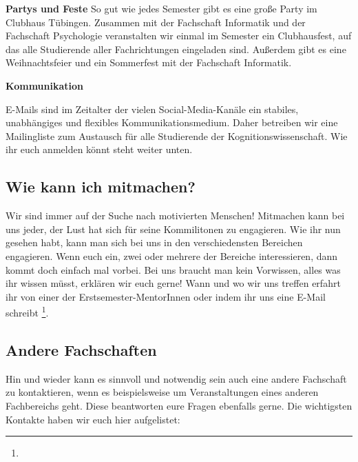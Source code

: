 \pagebreak

\textbf{Partys und Feste}
So gut wie jedes Semester gibt es eine große Party im Clubhaus Tübingen. Zusammen mit der Fachschaft Informatik und der Fachschaft Psychologie veranstalten wir einmal im Semester ein Clubhausfest, auf das alle Studierende aller Fachrichtungen eingeladen sind. Außerdem gibt es eine Weihnachtsfeier und ein Sommerfest mit der Fachschaft Informatik.

\textbf{Kommunikation}

E-Mails sind im Zeitalter der vielen Social-Media-Kanäle ein stabiles, unabhängiges und flexibles Kommunikationsmedium. Daher betreiben wir eine Mailingliste zum Austausch für alle Studierende der Kognitionswissenschaft. Wie ihr euch anmelden könnt steht weiter unten. \\

\subsection{Wie kann ich mitmachen?}
Wir sind immer auf der Suche nach motivierten Menschen! Mitmachen kann bei uns jeder, der Lust hat sich für seine Kommilitonen zu engagieren. Wie ihr nun gesehen habt, kann man sich bei uns in den verschiedensten Bereichen engagieren. Wenn euch ein, zwei oder mehrere der Bereiche interessieren, dann kommt doch einfach mal vorbei. Bei uns braucht man kein Vorwissen, alles was ihr wissen müsst, erklären wir euch gerne!
Wann und wo wir uns treffen erfahrt ihr von einer der Erstsemester-MentorInnen oder indem ihr uns eine E-Mail schreibt \footnote{}.

\vfill
\subsection{Andere Fachschaften}
Hin und wieder kann es sinnvoll und notwendig sein auch eine andere Fachschaft zu kontaktieren, wenn es beispielsweise um Veranstaltungen eines anderen Fachbereichs geht. Diese beantworten eure Fragen ebenfalls gerne. Die wichtigsten Kontakte haben wir euch hier aufgelistet:

